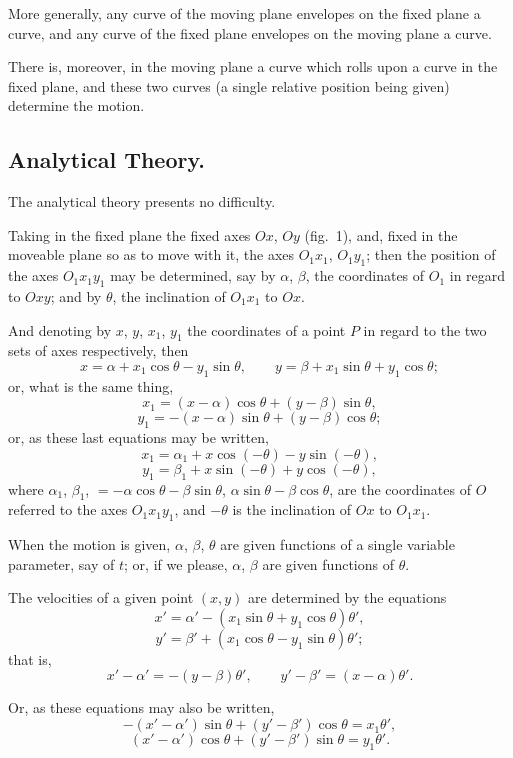 \documentclass[12pt,a4paper]{article}
\theoremstyle{plain}
\begin{document}
More generally, any curve of the moving plane envelopes on the fixed
plane a curve, and any curve of the fixed plane envelopes on the moving
plane a curve.

There is, moreover, in the moving plane a curve which rolls upon a
curve in the fixed plane, and these two curves (a single relative position
being given) determine the motion.

\subsection*{Analytical Theory.}

The analytical theory presents no difficulty.

Taking in the fixed plane the fixed axes $Ox$, $Oy$ (fig.~1), and, fixed
in the moveable plane so as to move with it, the axes $O_1x_1$, $O_1y_1$;
then the position of the axes $O_1x_1y_1$ may be determined, say by
$\alpha$, $\beta$, the coordinates of $O_1$ in regard to $Oxy$; and by $\theta$,
the inclination of $O_1x_1$ to $Ox$.

And denoting by $x$, $y$, $x_1$, $y_1$ the coordinates of a point $P$ in
regard to the two sets of axes respectively, then
\[
x = \alpha + x_1\cos\theta - y_1\sin\theta,\qquad
y = \beta + x_1\sin\theta + y_1\cos\theta;
\]
or, what is the same thing,
\[
x_1 = (x-\alpha)\cos\theta + (y-\beta)\sin\theta,
\]
\[
y_1 = -(x-\alpha)\sin\theta + (y-\beta)\cos\theta;
\]
or, as these last equations may be written,
\[
x_1 = \alpha_1 + x\cos(-\theta) - y\sin(-\theta),
\]
\[
y_1 = \beta_1 + x\sin(-\theta) + y\cos(-\theta),
\]
where $\alpha_1$, $\beta_1$, $=-\alpha\cos\theta-\beta\sin\theta$,
$\alpha\sin\theta-\beta\cos\theta$, are the coordinates of $O$ referred to
the axes $O_1x_1y_1$, and $-\theta$ is the inclination of $Ox$ to $O_1x_1$.

When the motion is given, $\alpha$, $\beta$, $\theta$ are given functions of a single
variable parameter, say of $t$; or, if we please, $\alpha$, $\beta$ are given functions
of $\theta$.

The velocities of a given point $(x,y)$ are determined by the equations
\[
x' = \alpha' - (x_1\sin\theta + y_1\cos\theta)\theta',
\]
\[
y' = \beta' + (x_1\cos\theta - y_1\sin\theta)\theta';
\]
that is,
\[
x'-\alpha' = -(y-\beta)\theta',\qquad y'-\beta' = (x-\alpha)\theta'.
\]

Or, as these equations may also be written,
\[
-(x'-\alpha')\sin\theta + (y'-\beta')\cos\theta = x_1\theta',
\]
\[
(x'-\alpha')\cos\theta + (y'-\beta')\sin\theta = y_1\theta'.
\]
\end{document}
